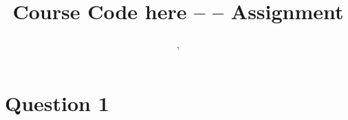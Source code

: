 \documentclass[11pt]{article}
\title{Course Code here -- \Session  -- Assignment \Assignment}
\author{\Name, \EmailAddress}
\newcommand{\question}[1]{\section*{Question #1} }
\begin{document}
\maketitle

\question{1} 
\end{document}
